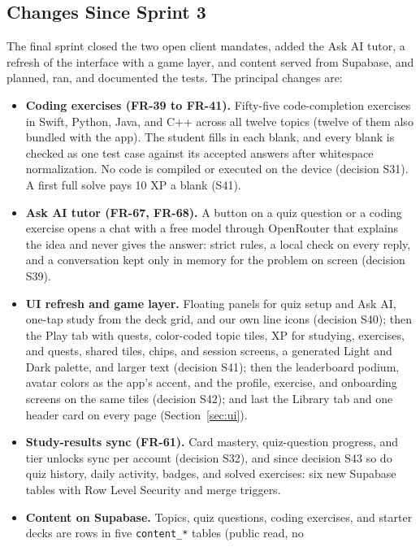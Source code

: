 \documentclass[12pt,letterpaper]{article}
\begin{document}
\subsection{Changes Since Sprint 3}
The final sprint closed the two open client mandates, added the Ask AI tutor, a
refresh of the interface with a game layer, and content served from Supabase, and
planned, ran, and documented the tests. The principal changes are:
\begin{itemize}
  \item \textbf{Coding exercises (FR-39 to FR-41).} Fifty-five code-completion
        exercises in Swift, Python, Java, and C++ across all twelve topics (twelve of
        them also bundled with the app). The student fills in each
        blank, and every blank is checked as one test case against its accepted
        answers after whitespace normalization. No code is compiled or executed on
        the device (decision S31). A first full solve pays 10 XP a blank (S41).
  \item \textbf{Ask AI tutor (FR-67, FR-68).} A button on a quiz question or a coding
        exercise opens a chat with a free model through OpenRouter that explains the
        idea and never gives the answer: strict rules, a local check on every reply,
        and a conversation kept only in memory for the problem on screen
        (decision S39).
  \item \textbf{UI refresh and game layer.} Floating panels for quiz setup and Ask AI,
        one-tap study from the deck grid, and our own line icons (decision S40);
        then the Play tab with quests, color-coded topic tiles, XP for studying,
        exercises, and quests, shared tiles, chips, and session screens, a generated
        Light and Dark palette, and larger text (decision S41); then the
        leaderboard podium, avatar colors as the app's accent, and the profile,
        exercise, and onboarding screens on the same tiles (decision S42); and
        last the Library tab and one header card on every page
        (Section~\ref{sec:ui}).
  \item \textbf{Study-results sync (FR-61).} Card mastery, quiz-question progress,
        and tier unlocks sync per account (decision S32), and since decision S43 so
        do quiz history, daily activity, badges, and solved exercises: six new
        Supabase tables with Row Level Security and merge triggers.
  \item \textbf{Content on Supabase.} Topics, quiz questions, coding exercises, and
        starter decks are rows in five \texttt{content\_*} tables (public read, no

\end{itemize}
\end{document}
